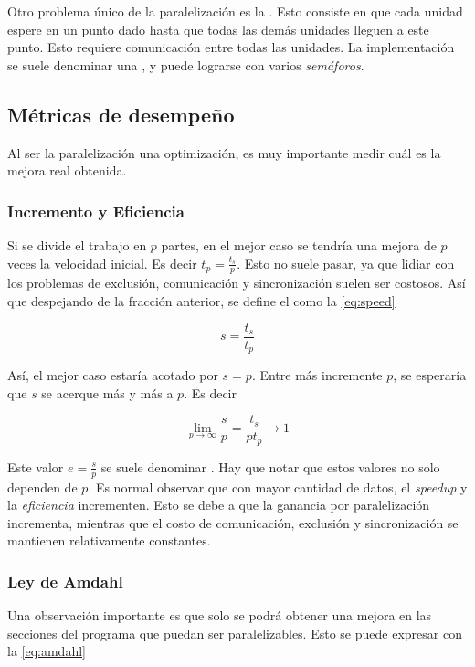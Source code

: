 Otro problema único de la paralelización es la . Esto
consiste en que cada unidad espere en un punto dado hasta que todas las demás
unidades lleguen a este punto. Esto requiere comunicación entre todas las
unidades. La implementación se suele denominar una , y puede
lograrse con varios \emph{semáforos}.

\subsection{Métricas de desempeño}

Al ser la paralelización una optimización, es muy importante medir cuál es
la mejora real obtenida.

\subsubsection{Incremento y Eficiencia}

Si se divide el trabajo en $p$ partes, en el mejor caso se tendría una mejora
de $p$ veces la velocidad inicial. Es decir $t_{p} = \frac{t_{s}}{p}$. Esto no
suele pasar, ya que lidiar con los problemas de exclusión, comunicación y
sincronización suelen ser costosos. Así que despejando de la fracción anterior,
se define el  como la \cref{eq:speed}

\begin{equation}
  \label{eq:speed}
s = \frac{t_{s}}{t_{p}}
\end{equation}

Así, el mejor caso estaría acotado por $s = p$. Entre más incremente $p$, se
esperaría que $s$ se acerque más y más a $p$. Es decir

\[
\lim_{p \to \infty}{\frac{s}{p}} = \frac{t_{s}}{pt_{p}} \to 1
\]

Este valor $e = \frac{s}{p}$ se suele denominar . Hay que notar
que estos valores no solo dependen de $p$. Es normal observar que con mayor
cantidad de datos, el \emph{speedup} y la \emph{eficiencia} incrementen. Esto
se debe a que la ganancia por paralelización incrementa, mientras que el costo
de comunicación, exclusión y sincronización se mantienen relativamente
constantes.

\subsubsection{Ley de Amdahl}

Una observación importante es que solo se podrá obtener una mejora en las
secciones del programa que puedan ser paralelizables. Esto se puede expresar
con la \cref{eq:amdahl}

